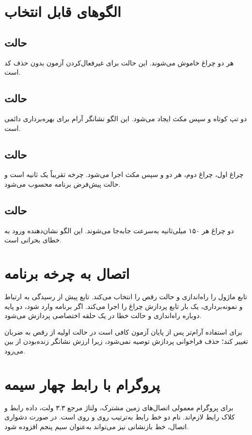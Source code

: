 \section{الگوهای قابل انتخاب}
\subsection{حالت }
هر دو چراغ خاموش می‌شوند. این حالت برای غیرفعال‌کردن آزمون بدون حذف کد است.

\subsection{حالت }
دو تپ کوتاه و سپس مکث ایجاد می‌شود. این الگو نشانگر آرام برای بهره‌برداری دائمی است.

\subsection{حالت }
چراغ اول، چراغ دوم، هر دو و سپس مکث اجرا می‌شود. چرخه تقریباً یک ثانیه است و حالت پیش‌فرض برنامه محسوب می‌شود.

\subsection{حالت }
دو چراغ هر ۱۵۰ میلی‌ثانیه به‌سرعت جابه‌جا می‌شوند. این الگو نشان‌دهنده ورود به خطای بحرانی است.

\section{اتصال به چرخه برنامه}
تابع
ماژول را راه‌اندازی و حالت رقص را انتخاب می‌کند. تابع
پیش از رسیدگی به ارتباط و نمونه‌برداری، یک بار تابع پردازش چراغ را اجرا می‌کند. اگر برنامه وارد
شود، دو پایه دوباره راه‌اندازی و حالت خطا در یک حلقه اختصاصی پردازش می‌شود.

برای استفاده آرام‌تر پس از پایان آزمون کافی است در
حالت اولیه از رقص به ضربان تغییر کند؛ حذف فراخوانی پردازش توصیه نمی‌شود، زیرا ارزش نشانگر زنده‌بودن از بین می‌رود.

\section{پروگرام با رابط چهار سیمه}
برای پروگرام معمولی اتصال‌های زمین مشترک، ولتاژ مرجع ۳.۳ ولت، داده رابط و کلاک رابط لازم‌اند. نام دو خط رابط به‌ترتیب
روی
و
روی
است. در صورت دشواری اتصال، خط بازنشانی نیز می‌تواند به‌عنوان سیم پنجم افزوده شود.

